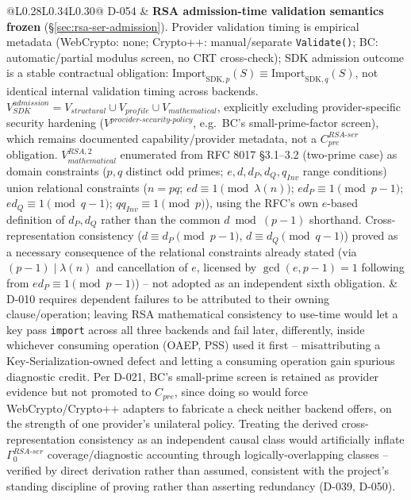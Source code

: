 \documentclass[11pt,a4paper]{article}
\begin{document}
\begin{longtable}{@{}L{0.28\textwidth}L{0.34\textwidth}L{0.30\textwidth}@{}}
D-054 & \textbf{RSA admission-time validation semantics frozen} (\S\ref{sec:rsa-ser-admission}). Provider validation timing is empirical metadata (WebCrypto: none; Crypto++: manual/separate \texttt{Validate()}; BC: automatic/partial modulus screen, no CRT cross-check); SDK admission outcome is a stable contractual obligation: $\text{Import}_{\mathrm{SDK},p}(S) \equiv \text{Import}_{\mathrm{SDK},q}(S)$, not identical internal validation timing across backends. $V^{admission}_{SDK} = V_{structural} \cup V_{profile} \cup V_{mathematical}$, explicitly excluding provider-specific security hardening ($V^{provider\text{-}security\text{-}policy}$, e.g.\ BC's small-prime-factor screen), which remains documented capability/provider metadata, not a $C_{pre}^{RSA\text{-}ser}$ obligation. $V_{mathematical}^{RSA,2}$ enumerated from RFC 8017 \S3.1--3.2 (two-prime case) as domain constraints ($p,q$ distinct odd primes; $e,d,d_P,d_Q,q_{Inv}$ range conditions) union relational constraints ($n=pq$; $ed\equiv1\pmod{\lambda(n)}$; $ed_P\equiv1\pmod{p-1}$; $ed_Q\equiv1\pmod{q-1}$; $qq_{Inv}\equiv1\pmod p$), using the RFC's own $e$-based definition of $d_P,d_Q$ rather than the common $d\bmod(p-1)$ shorthand. Cross-representation consistency ($d\equiv d_P\pmod{p-1}$, $d\equiv d_Q\pmod{q-1}$) proved as a necessary consequence of the relational constraints already stated (via $(p-1)\mid\lambda(n)$ and cancellation of $e$, licensed by $\gcd(e,p-1)=1$ following from $ed_P\equiv1\pmod{p-1}$) -- not adopted as an independent sixth obligation. & D-010 requires dependent failures to be attributed to their owning clause/operation; leaving RSA mathematical consistency to use-time would let a key pass \texttt{import} across all three backends and fail later, differently, inside whichever consuming operation (OAEP, PSS) used it first -- misattributing a Key-Serialization-owned defect and letting a consuming operation gain spurious diagnostic credit. Per D-021, BC's small-prime screen is retained as provider evidence but not promoted to $C_{pre}$, since doing so would force WebCrypto/Crypto++ adapters to fabricate a check neither backend offers, on the strength of one provider's unilateral policy. Treating the derived cross-representation consistency as an independent causal class would artificially inflate $\Gamma_0^{RSA\text{-}ser}$ coverage/diagnostic accounting through logically-overlapping classes -- verified by direct derivation rather than assumed, consistent with the project's standing discipline of proving rather than asserting redundancy (D-039, D-050).\\

\end{longtable}
\end{document}
